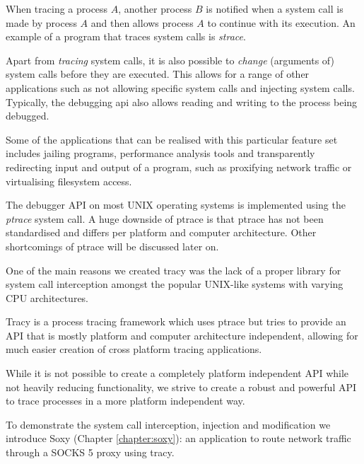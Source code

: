 \documentclass[a4paper, 10pt]{report}
\begin{document}
When tracing a process $A$, another process $B$ is notified when a system call
is made by process $A$  and then allows process $A$ to continue with its
execution. An example of a program that traces system calls is
\textit{strace}\cite{strace}.

Apart from \textit{tracing} system calls, it is also possible to
\textit{change}
(arguments of) system calls before they are executed. This allows for a range
of other applications such as not allowing specific system calls and
injecting system calls. Typically, the debugging api also allows reading and
writing to the process being debugged.

Some of the applications that can be realised with this particular feature set
includes jailing programs, performance analysis tools and transparently
redirecting input and output of a program, such as proxifying network
traffic or virtualising filesystem access.

The debugger API on most UNIX operating systems is implemented using the
\textit{ptrace} system call. A huge downside of ptrace is that ptrace
has not been standardised and differs per platform and computer architecture.
Other shortcomings of ptrace will be discussed later on.

One of the main reasons we created tracy was the lack of a proper library
for system call interception amongst the popular UNIX-like systems with
varying CPU architectures.

Tracy is a process tracing framework which uses ptrace but tries to provide
an API that is mostly platform and computer architecture independent,
allowing for much easier creation of cross platform tracing applications.

While it is not possible to create a completely platform independent API while
not heavily reducing functionality, we strive to create a robust and powerful
API to trace processes in a more platform independent way.

To demonstrate the system call interception, injection and modification
we introduce Soxy (Chapter \ref{chapter:soxy}): an application to route network
traffic through a SOCKS 5 proxy using tracy.

%
\end{document}
